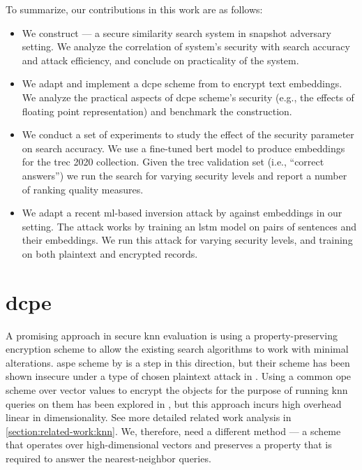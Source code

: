 		To summarize, our contributions in this work are as follows:
		\begin{itemize}
			\item
				We construct \kanon{} --- a secure similarity search system in snapshot adversary setting.
				We analyze the correlation of system's security with search accuracy and attack efficiency, and conclude on practicality of the \kanon{} system.

			\item
				We adapt and implement a \acrfull{dcpe} scheme from \cite{dcpe} to encrypt text embeddings.
				We analyze the practical aspects of \acrshort{dcpe} scheme's security (e.g., the effects of floating point representation) and benchmark the construction.

			\item
				We conduct a set of experiments to study the effect of the security parameter on search accuracy.
				We use a fine-tuned \acrshort{bert} model to produce embeddings for the \acrshort{trec} 2020 collection.
				Given the \acrshort{trec} validation set (i.e., ``correct answers'') we run the search for varying security levels and report a number of ranking quality measures.

			\item
				We adapt a recent \acrshort{ml}-based inversion attack by \textcite{embedding-attacks} against embeddings in our setting.
				The attack works by training an \acrshort{lstm} model on pairs of sentences and their embeddings.
				We run this attack for varying security levels, and training on both plaintext and encrypted records.

		\end{itemize}

	\section{\texorpdfstring{\acrlong{dcpe}}{Distance Comparison Preserving Encryption}}

		A promising approach in secure \acrshort{knn} evaluation is using a property-preserving encryption scheme to allow the existing search algorithms to work with minimal alterations.
		\acrshort{aspe} scheme by \textcite{knn-aspe} is a step in this direction, but their scheme has been shown insecure under a type of chosen plaintext attack in \cite{secure-nn-revisited-break-aspe}.
		Using a common \acrshort{ope} scheme over vector values to encrypt the objects for the purpose of running \acrshort{knn} queries on them has been explored in \cite{quick-n}, but this approach incurs high overhead linear in dimensionality.
		See more detailed related work analysis in \cref{section:related-work:knn}.
		We, therefore, need a different method --- a scheme that operates over high-dimensional vectors and preserves a property that is required to answer the nearest-neighbor queries.

